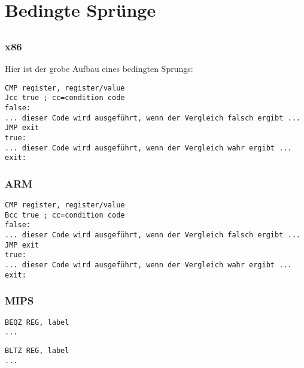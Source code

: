 \section{Bedingte Sprünge}
\label{sec:Jcc}






\subsection{\Conclusion{}}

\subsubsection{x86}

Hier ist der grobe Aufbau eines bedingten Sprungs:

\begin{lstlisting}[caption=x86,style=customasmx86]
CMP register, register/value
Jcc true ; cc=condition code
false:
... dieser Code wird ausgeführt, wenn der Vergleich falsch ergibt ...
JMP exit 
true:
... dieser Code wird ausgeführt, wenn der Vergleich wahr ergibt ...
exit:
\end{lstlisting}

\subsubsection{ARM}

\begin{lstlisting}[caption=ARM,style=customasmARM]
CMP register, register/value
Bcc true ; cc=condition code
false:
... dieser Code wird ausgeführt, wenn der Vergleich falsch ergibt ...
JMP exit 
true:
... dieser Code wird ausgeführt, wenn der Vergleich wahr ergibt ...
exit:
\end{lstlisting}

\subsubsection{MIPS}

\begin{lstlisting}[caption=prüfe auf Null,style=customasmMIPS]
BEQZ REG, label
...
\end{lstlisting}
\begin{lstlisting}[caption=Prüfe auf kleiner Null,style=customasmMIPS]
BLTZ REG, label
...
\end{lstlisting}

